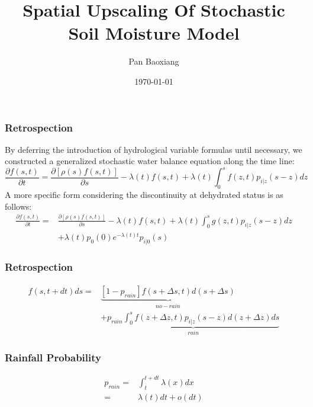 \documentclass{beamer}
\begin{document}
\title{Spatial Upscaling Of Stochastic Soil Moisture Model}
\author{Pan Baoxiang}
\date{\today}
\maketitle

\begin{frame}
\frametitle{Retrospection}
By deferring the introduction of hydrological variable formulas until necessary, we constructed a generalized stochastic water balance equation along the time line:
\begin{equation}
\frac{\partial{f(s,t)}}{\partial t}=\frac{\partial{[\rho(s)f(s,t)]}}{\partial s}-\lambda(t)f(s,t)+\lambda(t)\int_{0}^{s} f(z,t)p_{i|z}(s-z)dz
\end{equation}
A more specific form considering the discontinuity at dehydrated status is as follows:
 \begin{equation}
 \begin{split}
 \frac{\partial{f(s,t)}}{\partial t}=&\frac{\partial{[\rho(s)f(s,t)]}}{\partial s}-\lambda(t)f(s,t)+\lambda(t)\int_{0}^{s} g(z,t)p_{i|z}(s-z)dz\\&+\lambda(t)p_0(0)e^{-\lambda(t) t}p_{i|0}(s)
 \end{split}
 \end{equation}
\end{frame}


\begin{frame}
\frametitle{Retrospection}
\begin{equation}
\begin{split}
f(s,t+dt)ds=&\underbrace{[1-p_{rain}]f(s+\Delta s,t)d(s+\Delta s)}_{no-rain}\\&+\underbrace{p_{rain} \int_{0}^{s} f(z+\Delta z,t)p_{i|z}(s-z)d(z+\Delta z)ds}_{rain}
\end{split}
\end{equation}
\end{frame}

\begin{frame}
\frametitle{Rainfall Probability}
\begin{equation}
\begin{split}
p_{rain}=&\int_t^{t+dt} \lambda(x)dx\\=&\lambda(t)dt+o(dt)
\end{split}
\end{equation}
\end{frame}
\end{document}
